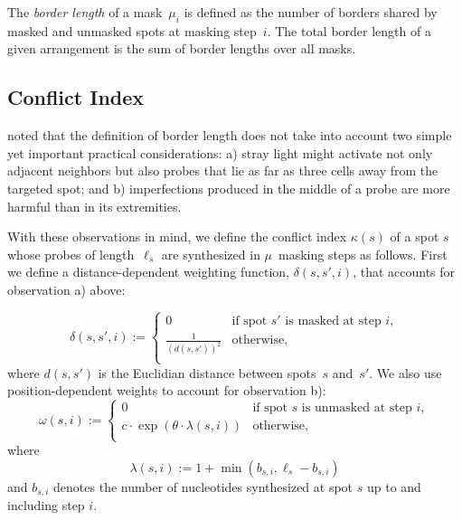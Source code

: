 \documentclass{bioinfo}
\begin{document}
The \emph{border length} of a mask~$\mu_{i}$ is defined as the number of borders shared by masked and unmasked spots at masking step~$i$. The total border length of a given arrangement is the sum of border lengths over all masks.

\subsection{Conflict Index}

\citealp{KAHNG03_1} noted that the definition of border length does not take into account two simple yet important practical considerations: a) stray light might activate not only adjacent neighbors but also probes that lie as far as three cells away from the targeted spot; and b) imperfections produced in the middle of a probe are more harmful than in its extremities.

With these observations in mind, we define the conflict index $\kappa(s)$ of a spot $s$ whose probes of length~$\ell_{s}$ are synthesized in $\mu$~masking steps as follows. First we define a distance-dependent weighting function, $\delta(s,s',i)$, that accounts for observation a) above:

\begin{equation}
\label{eq:dist_weight} \delta(s,s',i) :=
        \left\{
                \begin{array}{ll}
                        0 & \mbox{if spot $s'$ is masked at step $i$}, \\
                        \frac{1}{(d(s,s'))^{2}} & \mbox{otherwise}, \\
                \end{array}
        \right.
\end{equation}
where $d(s,s')$ is the Euclidian distance between spots~$s$ and~$s'$. We also use position-dependent weights to account for observation b):
\begin{equation}
\label{eq:pos_mult} \omega(s,i) :=
        \left\{
                \begin{array}{ll}
                        0 & \mbox{if spot $s$ is unmasked at step $i$}, \\
                        c \cdot \exp{\left(\theta \cdot \lambda(s,i)\right)} & \mbox{otherwise}, \\
                \end{array}
        \right.
\end{equation}
where
\begin{equation}
\label{eq:base_pos} \lambda(s,i) := 1 + \min(b_{s,i},\ell_{s} - b_{s,i})
\end{equation}
and $b_{s,i}$ denotes the number of nucleotides synthesized at spot $s$ up to and including step $i$.
\end{document}
